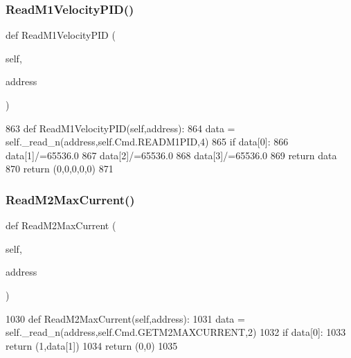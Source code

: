 \subsubsection{\texorpdfstring{Read\+M1\+Velocity\+P\+I\+D()}{ReadM1VelocityPID()}}
{\footnotesize\ttfamily def Read\+M1\+Velocity\+P\+ID (\begin{DoxyParamCaption}\item[{}]{self,  }\item[{}]{address }\end{DoxyParamCaption})}


\begin{DoxyCode}
863     \textcolor{keyword}{def }ReadM1VelocityPID(self,address):
864         data = self.\_read\_n(address,self.Cmd.READM1PID,4)
865         \textcolor{keywordflow}{if} data[0]:
866             data[1]/=65536.0
867             data[2]/=65536.0
868             data[3]/=65536.0
869             \textcolor{keywordflow}{return} data
870         \textcolor{keywordflow}{return} (0,0,0,0,0)
871 
\end{DoxyCode}
\mbox{\label{classtoxic__hardware_1_1roboclaw__3_1_1Roboclaw_a47f42d6846681c541c4f609d91020238}} 
\subsubsection{\texorpdfstring{Read\+M2\+Max\+Current()}{ReadM2MaxCurrent()}}
{\footnotesize\ttfamily def Read\+M2\+Max\+Current (\begin{DoxyParamCaption}\item[{}]{self,  }\item[{}]{address }\end{DoxyParamCaption})}


\begin{DoxyCode}
1030     \textcolor{keyword}{def }ReadM2MaxCurrent(self,address):
1031         data = self.\_read\_n(address,self.Cmd.GETM2MAXCURRENT,2)
1032         \textcolor{keywordflow}{if} data[0]:
1033             \textcolor{keywordflow}{return} (1,data[1])
1034         \textcolor{keywordflow}{return} (0,0)
1035 
\end{DoxyCode}
\mbox{\label{classtoxic__hardware_1_1roboclaw__3_1_1Roboclaw_a88fdebf9a672c22ff3789719b39dd994}} 
